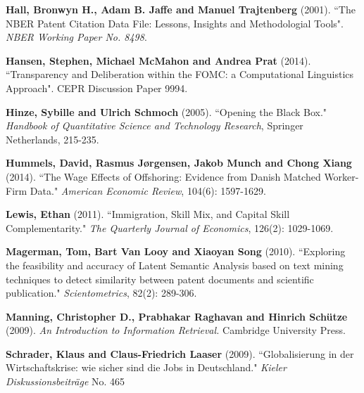 \documentclass[11pt,a4paper]{article}
\begin{document}
\begin{thebibliography}{9}
	 \textbf{Hall, Bronwyn H., Adam B. Jaffe and Manuel Trajtenberg} (2001). ``The NBER Patent Citation Data File: Lessons, Insights and Methodologial Tools". \textit{NBER Working Paper No. 8498}.
	
	 \textbf{Hansen, Stephen, Michael McMahon and Andrea Prat} (2014). ``Transparency and Deliberation within the FOMC:
a Computational Linguistics Approach". CEPR Discussion Paper 9994.

	 \textbf{Hinze, Sybille and Ulrich Schmoch} (2005). ``Opening the Black Box." \textit{Handbook of Quantitative Science and Technology Research}, Springer Netherlands, 215-235.
	
	 \textbf{Hummels, David, Rasmus Jørgensen, Jakob Munch and Chong Xiang} (2014). ``The Wage Effects of Offshoring: Evidence from Danish Matched Worker-Firm Data." \textit{American Economic Review}, 104(6): 1597-1629.
	
	 \textbf{Lewis, Ethan} (2011). ``Immigration, Skill Mix, and Capital Skill Complementarity." \textit{The Quarterly Journal of Economics}, 126(2): 1029-1069.
	
	
	 \textbf{Magerman, Tom, Bart Van Looy and Xiaoyan Song} (2010). ``Exploring the feasibility and accuracy of Latent Semantic Analysis based on text mining techniques to detect similarity between patent documents and scientific publication." \textit{Scientometrics}, 82(2): 289-306.	

	 \textbf{Manning, Christopher D., Prabhakar Raghavan and Hinrich Schütze} (2009). \textit{An Introduction to Information Retrieval.}  Cambridge University Press.
	
	 \textbf{Schrader, Klaus and Claus-Friedrich Laaser} (2009). ``Globalisierung in der Wirtschaftskrise: wie sicher sind die Jobs in Deutschland." \textit{Kieler Diskussionsbeiträge} No. 465
	
		
\end{thebibliography}





\end{document}
